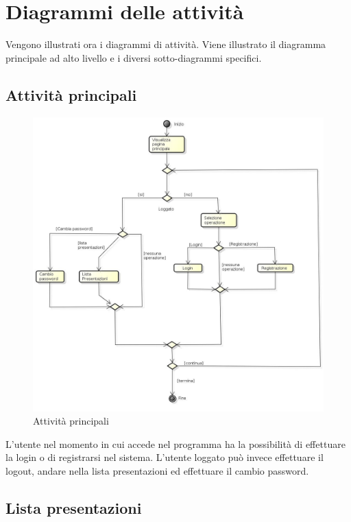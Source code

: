 \section{Diagrammi delle attività}
Vengono illustrati ora i diagrammi di attività. Viene illustrato il diagramma principale ad alto livello e i diversi sotto-diagrammi specifici.

\newpage

\subsection{Attività principali}

\begin{figure}[h!]
		\centering
		\includegraphics[scale=.4]{img/Premi.jpg}
		\caption{Attività principali}
		\label{fig:Attivita_principali}
\end{figure}

L'utente nel momento in cui accede nel programma ha la possibilità di effettuare la login o di registrarsi nel sistema. 
L'utente loggato può invece effettuare il logout, andare nella lista presentazioni ed effettuare il cambio password.

\subsection{Lista presentazioni}

